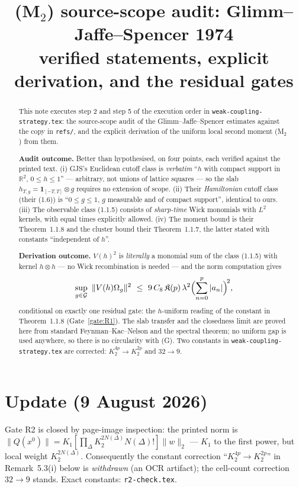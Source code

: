 \documentclass[11pt,a4paper]{article}
\title{(M$_2$) source-scope audit: Glimm--Jaffe--Spencer 1974\\
\large verified statements, explicit derivation, and the residual gates}
\author{}
\date{}
\theoremstyle{plain}
\theoremstyle{definition}
\newcommand{\R}{\mathbb{R}}
\newcommand{\Om}{\Omega}
\newcommand{\G}{\mathcal{G}}
\begin{document}
\maketitle

\section*{Update (9 August 2026)}
Gate R2 is closed by page-image inspection: the printed norm is $\|Q(x^0)\|=K_1[\prod_\Delta K_2^{2N(\Delta)}N(\Delta)!]\|w\|_2$ --- $K_1$ to the first power, but local weight $K_2^{2N(\Delta)}$. Consequently the constant correction ``$K_2^{4p}\to K_2^{2p}$'' in Remark~5.3(i) below is \emph{withdrawn} (an OCR artifact); the cell-count correction $32\to9$ stands. Exact constants: \texttt{r2-check.tex}.


\begin{abstract}
This note executes step 2 and step 5 of the execution order in
\texttt{weak-coupling-strategy.tex}: the source-scope audit of the Glimm--Jaffe--Spencer
estimates \cite{GJS} against the copy in \texttt{refs/}, and the explicit derivation of the
uniform local second moment (M$_2$) from them.

\smallskip
\noindent\textbf{Audit outcome.} Better than hypothesised, on four points, each verified against
the printed text. (i) GJS's Euclidean cutoff class is \emph{verbatim} ``$h$ with compact support
in $\R^2$, $0\le h\le1$'' --- arbitrary, not unions of lattice squares --- so the slab
$h_{T,g}=\mathbf 1_{[-T,T]}\otimes g$ requires no extension of scope. (ii) Their \emph{Hamiltonian}
cutoff class (their (1.6)) is ``$0\le g\le1$, $g$ measurable and of compact support'', identical
to ours. (iii) The observable class (1.1.5) consists of \emph{sharp-time} Wick monomials with
$L^2$ kernels, with equal times explicitly allowed. (iv) The moment bound is their
Theorem~1.1.8 and the cluster bound their Theorem~1.1.7, the latter stated with constants
``independent of $h$''.

\smallskip
\noindent\textbf{Derivation outcome.} $V(h)^2$ is \emph{literally} a monomial sum of the class
(1.1.5) with kernel $h\otimes h$ --- no Wick recombination is needed --- and the norm computation
gives
\[
  \sup_{g\in\G}\ \|V(h)\Om_g\|^2\ \le\ 9\,C_8\,\mathfrak K(p)\,\lambda^2
  \Bigl(\sum_{n=0}^p|a_n|\Bigr)^{\!2},
\]
conditional on exactly one residual gate: the $h$-uniform reading of the constant in
Theorem~1.1.8 (Gate~\ref{gate:R1}). The slab transfer and the closedness limit are proved here
from standard Feynman--Kac--Nelson and the spectral theorem; no uniform gap is used anywhere, so
there is no circularity with (G). Two constants in \texttt{weak-coupling-strategy.tex} are
corrected: $K_2^{4p}\to K_2^{2p}$ and $32\to9$.


\end{abstract}
\end{document}
